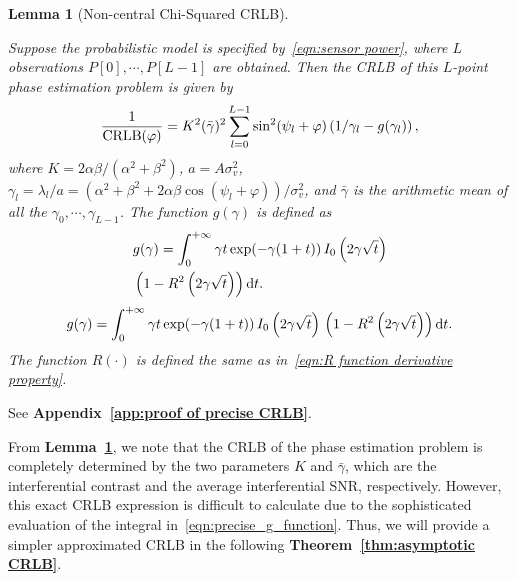\documentclass[journal,twocolumn]{IEEEtran}
\newtheorem{lemma}{\bf Lemma}
\theoremstyle{nonumberplain}
\begin{document}
    \begin{lemma}[Non-central Chi-Squared CRLB] \label{lemma:precise CRLB}\mbox{}\par
        Suppose the probabilistic model is specified by~\eqref{eqn:sensor power}, where $L$ observations $P[0],\cdots,P[L-1]$ are obtained. Then the CRLB of this $L$-point phase estimation problem is given by
        \begin{equation}
            \frac{1}{{\rm CRLB}(\varphi)} = K^2(\bar{\gamma})^2 \sum_{l=0}^{L-1}\sin^2(\psi_l+\varphi)\left(1/\gamma_l-g(\gamma_l)\right),
            \label{eqn:precise_CRLB}
        \end{equation}
        where $K=2\alpha\beta/(\alpha^2+\beta^2)$, $a=A\sigma_v^2$, $\gamma_l=\lambda_l/a=\left(\alpha^2+\beta^2+2\alpha\beta \cos(\psi_l+\varphi)\right)/\sigma_v^2$, and $\bar{\gamma}$ is the arithmetic mean of all the $\gamma_0,\cdots,\gamma_{L-1}$. The function $g(\gamma)$ is defined as 
        \ifx\onecol\undefined
            \begin{equation}\label{eqn:precise_g_function}
                \begin{aligned}
                    & g(\gamma)  = \int_{0}^{+\infty}\gamma t \, {\rm exp}(-\gamma(1+t))\, I_0\left(2\gamma\sqrt{t}\right) \\
                    & \left(1-R^2\left(2\gamma\sqrt{t}\right)\right){\rm d}t.
                \end{aligned}
            \end{equation}
        \else 
            \begin{equation}
                g(\gamma)  = \int_{0}^{+\infty}\gamma t \, {\rm exp}(-\gamma(1+t))\, I_0\left(2\gamma\sqrt{t}\right)\,\left(1-R^2\left(2\gamma\sqrt{t}\right)\right){\rm d}t.
                \label{eqn:precise_g_function}
            \end{equation}
        \fi
        The function $R(\cdot)$ is defined the same as in~\eqref{eqn:R function derivative property}.
    \end{lemma}
    \begin{IEEEproof}
        See {\bf Appendix~\ref{app:proof of precise CRLB}}. 
    \end{IEEEproof}

    From \textbf{Lemma~\ref{lemma:precise CRLB}}, we note that the CRLB of the phase estimation problem is completely determined by the two parameters $K$ and $\bar{\gamma}$, which are the interferential contrast and the average interferential SNR, respectively. 
    However, this exact CRLB expression is difficult to calculate due to the sophisticated evaluation of the integral in~\eqref{eqn:precise_g_function}.
    Thus, we will provide a simpler approximated CRLB in the following {\bf Theorem~\ref{thm:asymptotic CRLB}}. 
    
\end{document}
